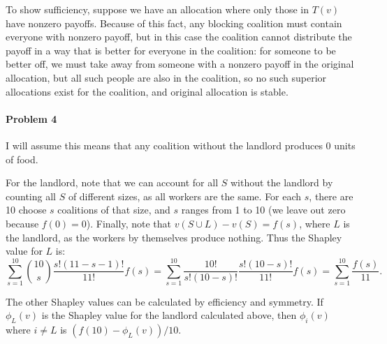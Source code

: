 \documentclass[12pt]{article}
\begin{document}
To show sufficiency, suppose we have an allocation where only those in $T(v)$
have nonzero payoffs. Because of this fact, any blocking coalition must
contain everyone with nonzero payoff, but in this case the coalition cannot
distribute the payoff in a way that is better for everyone in the coalition:
for someone to be better off, we must take away from someone with a nonzero
payoff in the original allocation, but all such people are also in the coalition,
so no such superior allocations exist for the coalition, and original allocation
is stable.

\paragraph{Problem 4}
I will assume this means that any coalition without the landlord produces 0
units of food.

For the landlord, note that we can account for all $S$ without the landlord by
counting all $S$ of different sizes, as all workers are the same. For each $s$,
there are 10 choose $s$ coalitions of that size, and $s$ ranges from 1 to 10
(we leave out zero because $f(0) = 0$).
Finally, note that $v(S\cup L) - v(S) = f(s)$, where $L$ is the landlord, as
the workers by themselves produce nothing. Thus the Shapley value for $L$ is:
\begin{displaymath}
  \sum_{s=1}^{10}\binom{10}{s}\frac{s!(11-s-1)!}{11!}f(s)
  = \sum_{s=1}^{10}\frac{10!}{s!(10-s)!}\frac{s!(10-s)!}{11!}f(s)
  = \sum_{s=1}^{10}\frac{f(s)}{11}.
\end{displaymath}

The other Shapley values can be calculated by efficiency and symmetry. If
$\phi_L(v)$ is the Shapley value for the landlord calculated above, then
$\phi_i(v)$ where $i \neq L$ is $(f(10)-\phi_L(v))/10$.

\end{document}

